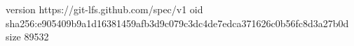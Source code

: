 version https://git-lfs.github.com/spec/v1
oid sha256:e905409b9a1d16381459afb3d9c079c3dc4de7edca371626c0b56fc8d3a27b0d
size 89532
